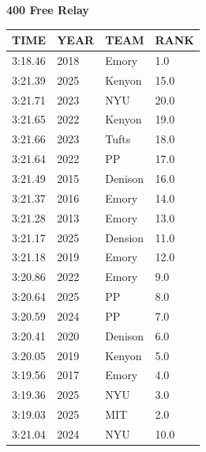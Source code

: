 \begin{table}[H]
\centering
\begin{minipage}[t]{0.6\textwidth}
\centering
\textbf{400 Free Relay}\\[0.1cm]
\begin{tabular}{@{}p{1.8cm}p{1.2cm}p{1.4cm}p{0.8cm}@{}}
\hline
    \textbf{TIME} & \textbf{YEAR} & \textbf{TEAM} & \textbf{RANK} \\
\hline
    3:18.46 & 2018 & Emory & 1.0 \\
    3:21.39 & 2025 & Kenyon & 15.0 \\
    3:21.71 & 2023 & NYU & 20.0 \\
    3:21.65 & 2022 & Kenyon & 19.0 \\
    3:21.66 & 2023 & Tufts & 18.0 \\
    3:21.64 & 2022 & PP & 17.0 \\
    3:21.49 & 2015 & Denison & 16.0 \\
    3:21.37 & 2016 & Emory & 14.0 \\
    3:21.28 & 2013 & Emory & 13.0 \\
    3:21.17 & 2025 & Dension & 11.0 \\
    3:21.18 & 2019 & Emory & 12.0 \\
    3:20.86 & 2022 & Emory & 9.0 \\
    3:20.64 & 2025 & PP & 8.0 \\
    3:20.59 & 2024 & PP & 7.0 \\
    3:20.41 & 2020 & Denison & 6.0 \\
    3:20.05 & 2019 & Kenyon & 5.0 \\
    3:19.56 & 2017 & Emory & 4.0 \\
    3:19.36 & 2025 & NYU & 3.0 \\
    3:19.03 & 2025 & MIT & 2.0 \\
    3:21.04 & 2024 & NYU & 10.0 \\
\hline
\end{tabular}
\end{minipage}
\end{table}


